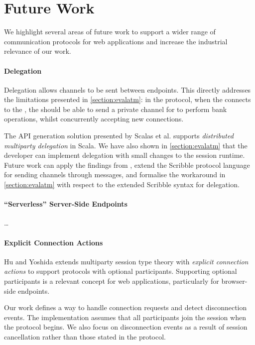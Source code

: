 \section{Future Work}

We highlight several areas of future work
to support a wider range of communication protocols
for web applications and increase the 
industrial relevance of our work.

\paragraph{Delegation}
Delegation allows channels to be sent between endpoints.
This directly addresses the limitations presented in
\cref{section:evalatm}: in the  protocol,
when the 
connects to the ,
the  should be able to send a private channel
for  to perform bank operations,
whilst concurrently accepting new connections.

The API generation solution 
presented by Scalas et al. \cite{LinearDecomp} supports
\textit{distributed multiparty delegation} in Scala.
We have also shown in \cref{section:evalatm} that
the developer can implement delegation with small changes
to the session runtime.
Future work can apply the findings from \cite{LinearDecomp},
extend the Scribble protocol language for sending
channels through messages, and formalise the workaround
in \cref{section:evalatm} with respect to the extended 
Scribble syntax for delegation.

\paragraph{``Serverless'' Server-Side Endpoints}
\dots

\paragraph{Explicit Connection Actions}
Hu and Yoshida \cite{ExplicitConnections} extends 
multiparty session type theory
with \textit{explicit connection actions} to support protocols 
with optional participants.
Supporting optional participants is a relevant concept
for web applications, particularly for browser-side endpoints.

Our work defines a way to handle connection requests
and detect disconnection events. The implementation assumes that
all participants join the session when the protocol begins.
We also focus on disconnection events as a result of session
cancellation rather than those stated in the protocol.


